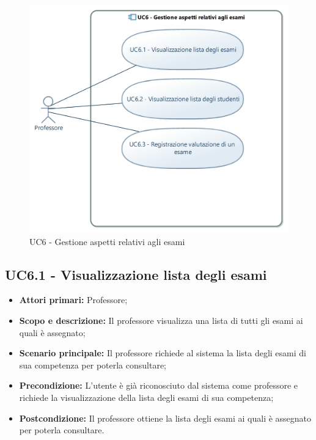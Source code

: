 \documentclass[AnalisiDeiRequisiti.tex]{subfiles}
\begin{document}
\begin{figure}[H]
	\centering
	\includegraphics[width=0.8\linewidth]{UC6.jpg}
	\caption{UC6 - Gestione aspetti relativi agli esami}
	\label{fig:UC6 - Gestione aspetti relativi agli esami}
\end{figure}

\subsection{UC6.1 - Visualizzazione lista degli esami}
\begin{itemize}
	\item \textbf{Attori primari:} Professore;\\
	\item \textbf{Scopo e descrizione:} Il professore visualizza una lista di tutti gli esami ai quali è assegnato;\\
	\item \textbf{Scenario principale:} Il professore richiede al sistema la lista degli esami di sua competenza per poterla consultare;\\
	\item \textbf{Precondizione:} L'utente è già riconosciuto dal sistema come professore e richiede la visualizzazione della lista degli esami di sua competenza;\\
	\item \textbf{Postcondizione:} Il professore ottiene la lista degli esami ai quali è assegnato per poterla consultare.\\
\end{itemize}
\end{document}
